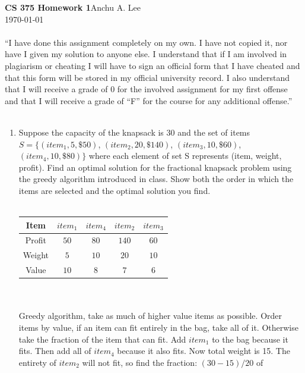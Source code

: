 \documentclass{article}
\begin{document}
    \noindent\textbf{CS 375 Homework 1}\hfill Anchu A. Lee\\
    \noindent\today
    \\\\“I have done this assignment completely on my own. I have not copied it, nor have I given my solution to anyone else. I understand that if I am involved in plagiarism or cheating I will have to sign an official form that I have cheated and that this form will be stored in my official university record. I also understand that I will receive a grade of 0 for the involved assignment for my first offense and that I will receive a grade of “F” for the course for any additional offense.” 
    \\\\
    \begin{enumerate}
        \item Suppose the capacity of the knapsack is 30 and the set of items 
        $S = \{(item_1, 5, \$50)$, $(item_2, 20, \$140)$, $(item_3, 10, \$60)$, 
        $(item_4, 10, \$80)\}$ where each element of set S represents (item, 
        weight, profit). Find an optimal solution for the fractional knapsack 
        problem using the greedy algorithm introduced in class. Show both the 
        order in which the items are selected and the optimal solution you 
        find.\\\\
            \begin{tabular}{| c || c | c | c | c |}
                \hline
                Item & $item_1$ & $item_4$ & $item_2$ & $item_3$ \\
                \hline
                Profit & $50$ & $80$ & $140$ & $60$ \\ 
                \hline
                Weight & $5$ & $10$ & $20$ & $10$ \\
                \hline
                Value & $10$ & $8$ & $7$ & $6$ \\
                \hline
            \end{tabular} \\\\ 
            Greedy algorithm, take as much of higher value items as possible.
            Order items by value, if an item can fit entirely in the bag, take
            all of it. Otherwise take the fraction of the item that can fit.
            Add $item_1$ to the bag because it fits. Then add all of $item_4$
            because it also fits. Now total weight is 15. The entirety of 
            $item_2$ will not fit, so find the fraction: $(30 - 15)/20$ of 

\end{enumerate}
\end{document}
